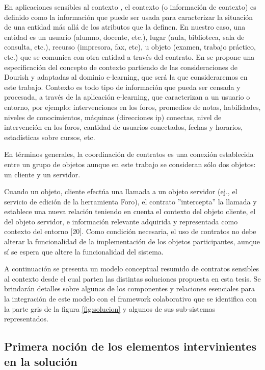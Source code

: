 En aplicaciones sensibles al contexto \cite{cap1.6}, el contexto (o información
de contexto) es definido como la información que puede ser usada
para caracterizar la situación de una entidad más allá de los atributos que la
definen. En nuestro caso, una entidad es un usuario (alumno, docente, etc.),
lugar (aula, biblioteca, sala de consulta, etc.), recurso (impresora, fax, etc),
u objeto (examen, trabajo práctico, etc.) que se comunica con otra entidad a
través del contrato. En \cite{cap1.2} se propone una especificación del concepto
de contexto partiendo de las consideraciones de Dourish \cite{cap1.20} y
adaptadas al dominio e-learning, que será la que consideraremos en este trabajo.
Contexto es todo tipo de información que pueda ser censada y procesada, a través
de la aplicación e-learning, que caracterizan a un usuario o entorno, por
ejemplo: intervenciones en los foros, promedios de notas, habilidades, niveles
de conocimientos, máquinas (direcciones ip) conectas, nivel de intervención en
los foros, cantidad de usuarios conectados, fechas y horarios, estadísticas
sobre cursos, etc.

En términos generales, la coordinación de contratos es una conexión
establecida entre un grupo de objetos aunque en este trabajo se consideran sólo
dos objetos: un cliente y un servidor.


Cuando un objeto, cliente efectúa una llamada a un objeto servidor (ej., el
servicio de edición de la herramienta Foro), el contrato ”intercepta” la
llamada y establece una nueva relación teniendo en cuenta el contexto del
objeto cliente, el del objeto servidor, e información relevante adquirida
y representada como contexto del entorno [20]. Como condición necesaria, el uso
de contratos no debe alterar la funcionalidad de la implementación de los
objetos participantes, aunque sí se espera que altere la funcionalidad del
sistema.


A continuación se presenta un modelo conceptual resumido de contratos sensibles
al contexto desde el cual parten las distintas soluciones propuesta en esta
tesis. Se brindarán detalles sobre algunas de los componentes y relaciones
esenciales para la integración de este modelo con el framework colaborativo que
se identifica con la parte gris de la figura \ref{fig:solucion} y algunos de
sus sub-sistemas representados.


\subsection{Primera noción de los elementos intervinientes en la solución}


